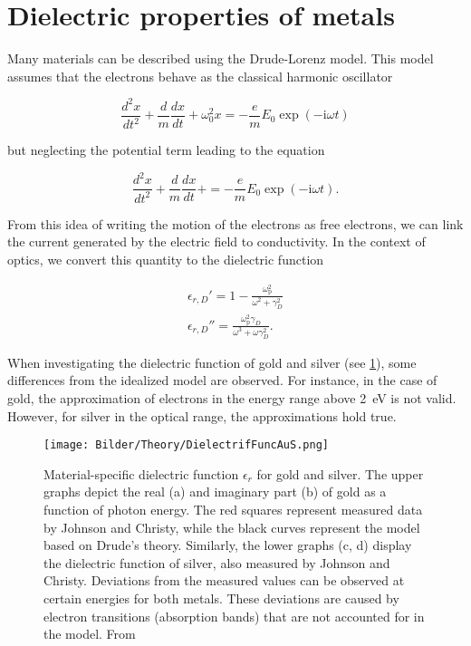 \section{Dielectric properties of metals}
\label{sec:Dielectric}

Many materials can be described using the Drude-Lorenz model. This model assumes that
the electrons behave as the classical harmonic oscillator

\begin{equation}
    \frac{d^2 x}{d t^2} + \frac{d}{m} \frac{dx}{dt} + \omega_{\mathrm{0}}^2x = -\frac{e}{m}E_{\mathrm{0}}\exp(-\mathrm{i}\omega t)
\end{equation}

but neglecting the potential term leading to the equation

\begin{equation}
    \frac{d^2 x}{d t^2} + \frac{d}{m} \frac{dx}{dt} + = -\frac{e}{m}E_{\mathrm{0}}\exp(-\mathrm{i}\omega t).
\end{equation}

From this idea of writing the motion of the electrons as free electrons, we can link the
current generated by the electric field to conductivity. In the context of optics, 
we convert this quantity to the dielectric function

\begin{gather}
    \epsilon_{r,D}' = 1 - \frac{\omega_{\mathrm{p}}^2}{\omega^2+\gamma_D^2} \\
    \epsilon_{r,D}'' =\frac{\omega_{\mathrm{p}}^2\gamma_D}{\omega^3+\omega\gamma_D^2}.
\end{gather}

When investigating the dielectric function of gold and silver (see \cref{fig:DielFuncAuS}), some differences from
the idealized model are observed. For instance, in the case of gold, the approximation of
electrons in the energy range above \SI{2}{\eV} is not valid. However, for silver in the optical
range, the approximations hold true.

\begin{figure}[ht]
    \centering
    \texttt{[image: Bilder/Theory/DielectrifFuncAuS.png]}
    \caption{Material-specific dielectric function $\epsilon_r$ for gold and silver. The upper graphs depict the real (a) and imaginary part (b) of gold as a function of photon energy. The red squares represent measured data by Johnson and Christy, while the black curves represent the model based on Drude's theory. Similarly, the lower graphs (c, d) display the dielectric function of silver, also measured by Johnson and Christy. Deviations from the measured values can be observed at certain energies for both metals. These deviations are caused by electron transitions (absorption bands) that are not accounted for in the model. From \cite{LehrstuhlExperimentalphysikIII.2023}}
    \label{fig:DielFuncAuS}
\end{figure}